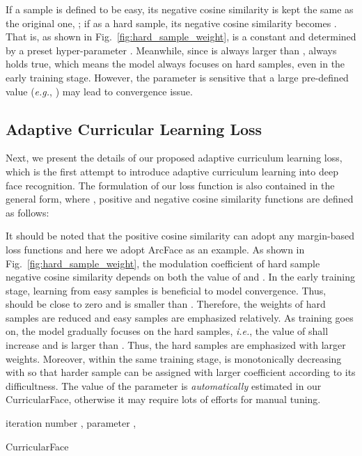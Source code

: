 \documentclass[10pt,twocolumn,letterpaper]{article}
\begin{document}
If a sample is defined to be easy, its negative cosine similarity is kept the same as the original one, ; if as a hard sample, its negative cosine similarity becomes . That is, as shown in Fig.~\ref{fig:hard_sample_weight},  is a constant and determined by a preset hyper-parameter . Meanwhile, since  is always larger than ,  always holds true, which means the model always focuses on hard samples, even in the early training stage.
However, the parameter  is sensitive that a large pre-defined value (\textit{e.g.}, ) may lead to convergence issue.


\subsection{Adaptive Curricular Learning Loss}
Next, we present the details of our proposed adaptive curriculum learning loss, which is the first attempt to introduce adaptive curriculum learning into deep face recognition.
The formulation of our loss function is also contained in the general form, where , positive and negative cosine similarity functions are defined as follows:


It should be noted that the positive cosine similarity can adopt any margin-based loss functions and here we adopt ArcFace as an example.
As shown in Fig.~\ref{fig:hard_sample_weight}, the modulation coefficient  of hard sample negative cosine similarity depends on both the value of  and .
In the early training stage, learning from easy samples is beneficial to model convergence.
Thus,  should be close to zero and  is smaller than . Therefore, the weights of hard samples are reduced and easy samples are emphasized relatively.
As training goes on, the model gradually focuses on the hard samples, \textit{i.e.}, the value of  shall increase and  is larger than .
Thus, the hard samples are emphasized with larger weights.
Moreover, within the same training stage,  is monotonically decreasing with  so that harder sample can be assigned with larger coefficient according to its difficultness.
The value of the parameter  is \textit{automatically} estimated in our CurricularFace, otherwise it may require lots of efforts for manual tuning.

\begin{algorithm}[t]
\small
\SetAlgoLined
{}
iteration  number , parameter , \;

 \caption{CurricularFace}
 \label{alg:training}
\end{algorithm}
\end{document}
